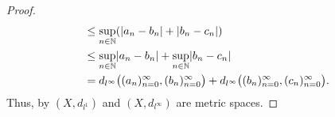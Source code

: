 \begin{proof}
\begin{align*}
                                                                     & \leq \sup_{n \in \N} (\abs{a_n - b_n} + \abs{b_n - c_n})                                                                               \\
                                                                     & \leq \sup_{n \in \N} \abs{a_n - b_n} + \sup_{n \in \N} \abs{b_n - c_n}                                                                 \\
                                                                     & = d_{l^\infty}\big((a_n)_{n = 0}^\infty, (b_n)_{n = 0}^\infty\big) + d_{l^\infty}\big((b_n)_{n = 0}^\infty, (c_n)_{n = 0}^\infty\big).
  \end{align*}
  Thus, by  \((X, d_{l^1})\) and \((X, d_{l^\infty})\) are metric spaces.


\end{proof}
